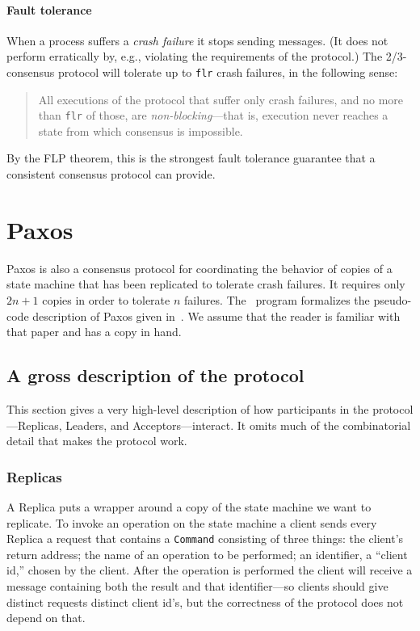 \documentclass[final]{article}
\begin{document}
\paragraph{Fault tolerance}

When a process suffers a \emph{crash failure} it stops sending
messages.  (It does not perform erratically by, e.g., violating the
requirements of the protocol.)  The 2/3-consensus protocol will
tolerate up to \lstinline{flr} crash failures, in the following sense:

\begin{quote}
All executions of the protocol that suffer only crash failures, and no
more than \lstinline{flr} of those, are \emph{non-blocking}---that is,
execution never reaches a state from which consensus is impossible.
\end{quote}

By the FLP theorem, this is the strongest fault tolerance guarantee
that a consistent consensus protocol can provide.

\section{Paxos}\label{sec:Paxos}

Paxos is also a consensus protocol for coordinating the behavior of
copies of a state machine that has been replicated to tolerate crash
failures.  It requires only $2n+1$ copies in order to tolerate $n$
failures.  The \eml\ program formalizes the pseudo-code description of
Paxos given in~\cite{VanRenesse:2011}.  We assume that the reader is
familiar with that paper and has a copy in hand.

\subsection{A gross description of the protocol}

This section gives a very high-level description of how participants
in the protocol---Replicas, Leaders, and Acceptors---interact.  It
omits much of the combinatorial detail that makes the protocol work.

\subsubsection{Replicas}

A Replica puts a wrapper around a copy of the state machine we want to
replicate.  To invoke an operation on the state machine a client sends
every Replica a request that contains a \lstinline{Command} consisting
of three things: the client's return address; the name of an operation
to be performed; an identifier, a ``client id,'' chosen by the client.
After the operation is performed the client will receive a message
containing both the result and that identifier---so clients should
give distinct requests distinct client id's, but the correctness of
the protocol does not depend on that.
\end{document}
